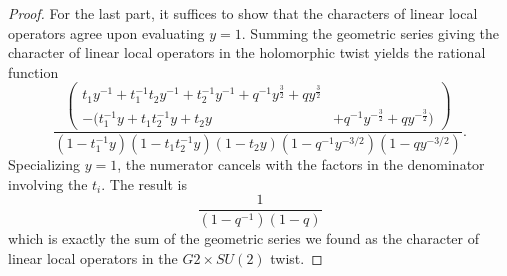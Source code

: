 \begin{proof}
For the last part, it suffices to show that the characters of linear local operators agree upon evaluating $y=1$. Summing the geometric series giving the character of linear local operators in the holomorphic twist yields the rational function \[\frac{\left (\begin{aligned}t_1y^{-1} + t_1^{-1}t_2y^{-1} + t_2^{-1}y^{-1} + q^{-1}y^{\frac 3 2} + qy^{\frac 3 2} \\  - (t_1^{-1}y + t_1t_2^{-1}y + t_2y &+ q^{-1}y^{-\frac 3 2} + qy^{-\frac 3 2})\end{aligned}\right)}{(1-t_1^{-1}y)(1-t_1t_2^{-1}y)(1-t_2y)(1-q^{-1}y^{-3/2})(1-qy^{-3/2})}.\] Specializing $y=1$, the numerator cancels with the factors in the denominator involving the $t_i$. The result is \[\frac{1}{(1-q^{-1})(1-q)}\] which is exactly the sum of the geometric series we found as the character of linear local operators in the $G2\times SU(2)$ twist. 
\end{proof}